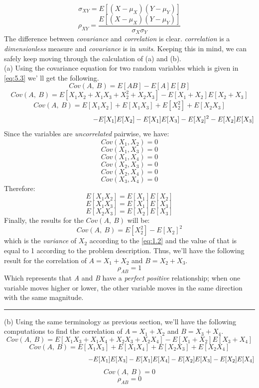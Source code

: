 \documentclass[12pt]{article}
\numberwithin{equation}{section}
\numberwithin{table}{section}
\numberwithin{figure}{section}
\begin{document}
\begin{equation}\label{eq:5.1}
	\sigma_{XY} = E[(X-\mu_X)(Y-\mu_Y)]
\end{equation}
\begin{equation}\label{eq:5.2}
	\rho_{XY} = \frac{E[(X-\mu_X)(Y-\mu_Y)]}{\sigma_X\sigma_Y}
\end{equation}
The difference between \textit{covariance} and \textit{correlation} is clear. \textit{correlation} is a \textit{dimensionless} measure and \textit{covariance} is in \textit{units}. Keeping this in mind, we can safely keep moving through the calculation of (a) and (b).\\
(a) Using the covariance equation for two random variables which is given in \ref{eq:5.3} we'
ll get the following.
\begin{equation}\label{eq:5.3}
Cov(A,\ B) = E[AB] - E[A]E[B]
\end{equation}
$$
	Cov(A,\ B) = E[X_1X_2 + X_1X_3 + X_2^2 + X_2X_3] - E[X_1 + X_2]E[X_2 + X_3]
$$
$$
Cov(A,\ B) = E[X_1X_2] + E[X_1X_3] + E[X_2^2] + E[X_2X_3]
$$
$$
\hspace{4.5cm}- E[X_1]E[X_2] - E[X_1]E[X_3] - E[X_2]^2 - E[X_2]E[X_3]
$$
Since the variables are \textit{uncorrelated} pairwise, we have:
$$
	Cov(X_1, X_2) = 0
$$
$$
Cov(X_1, X_3) = 0
$$
$$
Cov(X_1, X_4) = 0
$$
$$
Cov(X_2, X_3) = 0
$$
$$
Cov(X_2, X_4) = 0
$$
$$
Cov(X_3, X_4) = 0
$$
Therefore:
$$
E[X_1X_2] = E[X_1]E[X_2]
$$
$$
E[X_1X_3] = E[X_1]E[X_3]
$$
$$
E[X_2X_3] = E[X_2]E[X_3]
$$
Finally, the results for the $Cov(A,\ B)$ will be:
$$
	Cov(A,\ B) = E[X_2^2] - E[X_2]^2
$$
which is the \textit{variance} of $X_2$ according to the \ref{eq:1.2} and the value of that is equal to 1 according to the problem description. Thus, we'll have the following result for the correlation of $A=X_1+X_2$ and $B=X_2+X_3$.
$$
\boxed{\rho_{AB} =	1}
$$
Which represents that \textit{A} and \textit{B} have a \textit{perfect positive} relationship; when one variable moves higher or lower, the other variable moves in the same direction with the same magnitude.

\noindent\rule{\textwidth}{.5pt}
(b) Using the same terminology as previous section, we'll have the following computations to find the correlation of $A = X_1 + X_2$ and $B = X_3 + X_4$.
$$
Cov(A,\ B) = E[X_1X_3 + X_1X_4 + X_2X_3 + X_2X_4] - E[X_1 + X_2]E[X_3 + X_4]
$$
$$
Cov(A,\ B) = E[X_1X_3] + E[X_1X_4] + E[X_2X_3] + E[X_2X_4]
$$
$$
\hspace{4.5cm}- E[X_1]E[X_3] - E[X_1]E[X_4] - E[X_2]E[X_3] - E[X_2]E[X_4]
$$
$$
	Cov(A,\ B) = 0
$$
$$
\boxed{\rho_{AB} =	0}
$$
\end{document}
